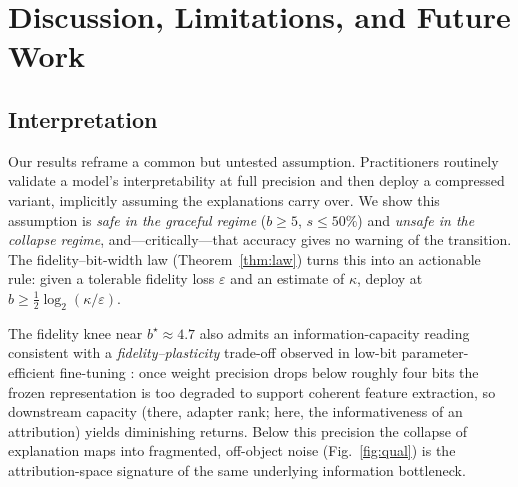 \section{Discussion, Limitations, and Future Work}
\label{sec:discussion}

\subsection{Interpretation}
Our results reframe a common but untested assumption. Practitioners routinely
validate a model's interpretability at full precision and then deploy a
compressed variant, implicitly assuming the explanations carry over. We show this
assumption is \emph{safe in the graceful regime} ($b\ge5$, $s\le50\%$) and
\emph{unsafe in the collapse regime}, and---critically---that accuracy gives no
warning of the transition. The fidelity--bit-width law
(Theorem~\ref{thm:law}) turns this into an actionable rule: given a tolerable
fidelity loss $\varepsilon$ and an estimate of $\kappa$, deploy at
$b\ge\tfrac12\log_2(\kappa/\varepsilon)$.

The fidelity knee near $b^\star\!\approx\!4.7$ also admits an
information-capacity reading consistent with a \emph{fidelity--plasticity}
trade-off observed in low-bit parameter-efficient fine-tuning
\cite{guo2024lqlora}: once weight precision drops below roughly four bits the
frozen representation is too degraded to support coherent feature extraction, so
downstream capacity (there, adapter rank; here, the informativeness of an
attribution) yields diminishing returns. Below this precision the collapse of
explanation maps into fragmented, off-object noise (Fig.~\ref{fig:qual}) is the
attribution-space signature of the same underlying information bottleneck.

